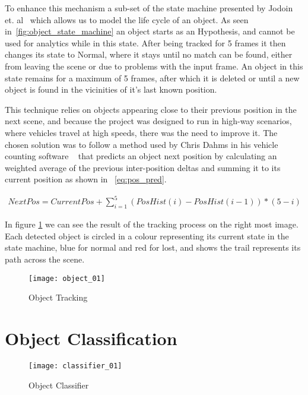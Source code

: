 To enhance this mechanism a sub-set of the state machine presented by Jodoin et. al~\cite{jodoin_urban_2014} which allows us to model the life cycle of an object. As seen in~\ref{fig:object_state_machine} an object starts as an Hypothesis, and cannot be used for analytics while in this state. After being tracked for 5 frames it then changes its state to Normal, where it stays until no match can be found, either from leaving the scene or due to problems with the input frame. An object in this state remains for a maximum of 5 frames, after which it is deleted or until a new object is found in the vicinities of it's last known position.

This technique relies on objects appearing close to their previous position in the next scene, and because the project was designed to run in high-way scenarios, where vehicles travel at high speeds, there was the need to improve it. The chosen solution was to follow a method used by Chris Dahms in his vehicle counting software ~\cite{dahms_opencv_3_car_counting_cpp_2017} that predicts an object next position by calculating an weighted average of the previous inter-position deltas and summing it to its current position as shown in ~\ref{eq:pos_pred}.

\begin{eqnarray}
\label{eq:pos_pred}
NextPos = CurrentPos + \sum_{i=1}^{5} (PosHist(i) - PosHist(i-1)) * (5-i)
\end{eqnarray}

In figure \ref{fig:object_tracking} we can see the result of the tracking process on the right most image. Each detected object is circled in a colour representing its current state in the state machine, blue for normal and red for lost, and shows the trail represents its path across the scene. 

\begin{figure}[h]
  \begin{center}
    \leavevmode
    \texttt{[image: object\_01]}
    \caption{Object Tracking}
    \label{fig:object_tracking}
  \end{center}
\end{figure}

\section{Object Classification}

\begin{figure}[h]
  \begin{center}
    \leavevmode
    \texttt{[image: classifier\_01]}
    \caption{Object Classifier}
    \label{fig:object_classifier}
  \end{center}
\end{figure}

